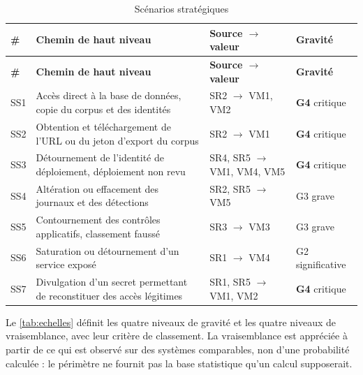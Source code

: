 \begin{longtable}{|P{1cm}|P{9.0cm}|P{2.8cm}|P{2.2cm}|}
\caption{Scénarios stratégiques}
\label{tab:scenarios-strategiques} \\
\hline
\textbf{\#} & \textbf{Chemin de haut niveau} & \textbf{Source $\rightarrow$ valeur} & \textbf{Gravité} \\
\hline
\endfirsthead
\hline
\textbf{\#} & \textbf{Chemin de haut niveau} & \textbf{Source $\rightarrow$ valeur} & \textbf{Gravité} \\
\hline
\endhead
SS1 & Accès direct à la base de données, copie du corpus et des identités & SR2 $\rightarrow$ VM1, VM2 & \textbf{G4} critique \\ \hline
SS2 & Obtention et téléchargement de l'URL ou du jeton d'export du corpus & SR2 $\rightarrow$ VM1 & \textbf{G4} critique \\ \hline
SS3 & Détournement de l'identité de déploiement, déploiement non revu & SR4, SR5 $\rightarrow$ VM1, VM4, VM5 & \textbf{G4} critique \\ \hline
SS4 & Altération ou effacement des journaux et des détections & SR2, SR5 $\rightarrow$ VM5 & G3 grave \\ \hline
SS5 & Contournement des contrôles applicatifs, classement faussé & SR3 $\rightarrow$ VM3 & G3 grave \\ \hline
SS6 & Saturation ou détournement d'un service exposé & SR1 $\rightarrow$ VM4 & G2 significative \\ \hline
SS7 & Divulgation d'un secret permettant de reconstituer des accès légitimes & SR1, SR5 $\rightarrow$ VM1, VM2 & \textbf{G4} critique \\
\hline
\end{longtable}

Le \cref{tab:echelles} définit les quatre niveaux de gravité et les quatre niveaux de
vraisemblance, avec leur critère de classement. La vraisemblance est appréciée à partir de ce qui
est observé sur des systèmes comparables, non d'une probabilité calculée : le périmètre ne fournit
pas la base statistique qu'un calcul supposerait.

